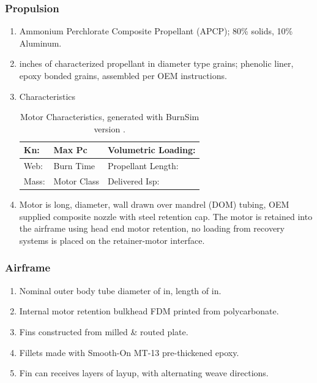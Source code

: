 \documentclass[12pt]{article}
\newcommand{\ph}{\framebox[48pt]{\rule{0pt}{12pt}}}
\begin{document}
\subsubsection{Propulsion}
\begin{enumerate}[label=(\alph*)]
    \item Ammonium Perchlorate Composite Propellant (APCP); 80\% solids, 10\% Aluminum.
    \item \ph inches of characterized propellant in \ph diameter \ph type grains; phenolic liner, epoxy bonded grains, assembled per OEM instructions.
    \item Characteristics
    \begin{table}[H]
        \centering
        \caption{Motor Characteristics, generated with BurnSim version \ph.}
        \begin{tabular}{|l|l|l|}
            \hline
            Kn: \ph & Max Pc \ph & Volumetric Loading: \ph \\ \hline
            Web: \ph & Burn Time \ph & Propellant Length: \ph \\ \hline
            Mass: \ph & Motor Class \ph & Delivered Isp: \ph \\ \hline
        \end{tabular}
    \end{table}
    \item Motor is \ph long, \ph diameter, \ph wall drawn over mandrel (DOM) tubing,
    OEM supplied composite nozzle with steel retention cap.
    The motor is retained into the airframe using head end motor retention,
    no loading from recovery systems is placed on the retainer-motor interface.
\end{enumerate}
\subsubsection{Airframe}
\begin{enumerate}[label=(\alph*)]
    \item Nominal outer body tube diameter of \ph in, length of \ph in.
    \item Internal motor retention bulkhead FDM printed from polycarbonate.
    \item Fins constructed from milled \& routed \ph plate.
    \item Fillets made with Smooth-On MT-13 pre-thickened epoxy.
    \item Fin can receives \ph layers of \ph layup, with alternating weave directions.
\end{enumerate}
\end{document}
